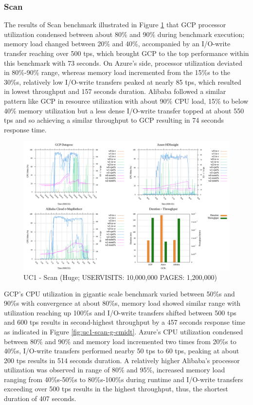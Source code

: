 \documentclass[review]{elsarticle}
\begin{document}
	\subsubsection{Scan}
	The results of Scan benchmark illustrated in Figure \ref{fig:uc1-scan-h-cmidt} that GCP processor utilization condensed between about 80\% and 90\% during benchmark execution; memory load changed between 20\% and 40\%, accompanied by an I/O-write transfer reaching over 500 tps, which brought GCP to the top performance within this benchmark with 73 seconds. On Azure's side, processor utilization deviated in 80\%-90\% range, whereas memory load incremented from the 15\%s to the 30\%s, relatively low I/O-write transfers peaked at nearly 85 tps, which resulted in lowest throughput and 157 seconds duration. Alibaba followed a similar pattern like GCP in resource utilization with about 90\% CPU load, 15\% to below 40\% memory utilization but a less dense I/O-write transfer topped at about 550 tps and so achieving a similar throughput to GCP resulting in 74 seconds response time.
	
	\begin{figure}[p]
		\caption{UC1 - Scan (Huge; USERVISITS: 10,000,000 PAGES: 1,200,000)}
		\label{fig:uc1-scan-h-cmidt}
		\includegraphics[width=\textwidth]{uc1-scan-h-cmidt}
		\centering
	\end{figure}
	
	GCP's CPU utilization in gigantic scale benchmark varied between 50\%s and 90\%s with convergence at about 80\%s, memory load showed similar range with utilization reaching up 100\%s and I/O-write transfers shifted between 500 tps and 600 tps results in second-highest throughput by a 457 seconds response time as indicated in Figure \ref{fig:uc1-scan-g-cmidt}. Azure's CPU utilization condensed between 80\% and 90\% and memory load incremented two times from 20\%s to 40\%s, I/O-write transfers performed nearby 50 tps to 60 tps, peaking at about 200 tps results in 514 seconds duration. A relatively higher Alibaba's processor utilization was observed in range of 80\% and 95\%, increased memory load ranging from 40\%s-50\%s to 80\%s-100\%s during runtime and I/O-write transfers exceeding over 500 tps results in the highest throughput, thus, the shortest duration of 407 seconds.
	
\end{document}
